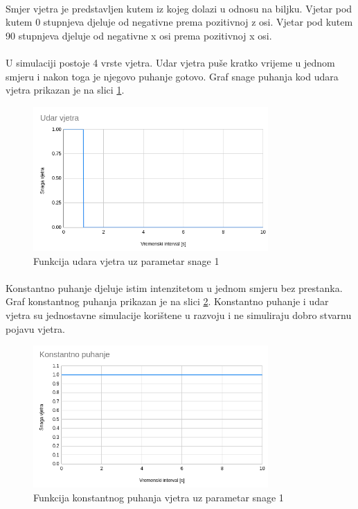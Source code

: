 \documentclass[times, utf8, diplomski]{fer}
\begin{document}
\paragraph{}
Smjer vjetra je predstavljen kutem iz kojeg dolazi u odnosu na biljku. Vjetar pod kutem 0 
stupnjeva djeluje od negativne prema pozitivnoj z osi. Vjetar pod kutem 90 stupnjeva djeluje 
od negativne x osi prema pozitivnoj x osi.

\paragraph{}
U simulaciji postoje 4 vrste vjetra. Udar vjetra puše kratko vrijeme u jednom smjeru i nakon 
toga je njegovo puhanje gotovo. Graf snage puhanja kod udara vjetra prikazan je na slici 
\ref{fig:43-0}.

\begin{figure}[h]
	\centering
	\includegraphics[width=0.8\textwidth]{img/43-0}
	\caption{Funkcija udara vjetra uz parametar snage 1}
	\label{fig:43-0}
\end{figure}

\paragraph{}
Konstantno puhanje djeluje istim intenzitetom u jednom smjeru bez prestanka. Graf konstantnog 
puhanja prikazan je na slici \ref{fig:43-1}. Konstantno puhanje i udar vjetra su jednostavne 
simulacije korištene u razvoju i ne simuliraju dobro stvarnu pojavu vjetra.

\begin{figure}[h]
	\centering
	\includegraphics[width=0.8\textwidth]{img/43-1}
	\caption{Funkcija konstantnog puhanja vjetra uz parametar snage 1}
	\label{fig:43-1}
\end{figure}
\end{document}
